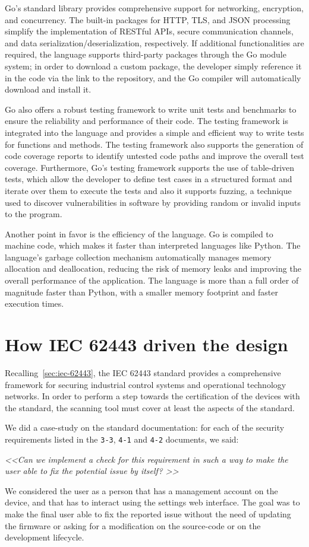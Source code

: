 Go's standard library provides comprehensive support for networking, encryption, and concurrency. The built-in packages for HTTP, TLS, and JSON processing simplify the implementation of RESTful APIs, secure communication channels, and data serialization/deserialization, respectively. If additional functionalities are required, the language supports third-party packages through the Go module system; in order to download a custom package, the developer simply reference it in the code via the link to the repository, and the Go compiler will automatically download and install it.

Go also offers a robust testing framework to write unit tests and benchmarks to ensure the reliability and performance of their code. The testing framework is integrated into the language and provides a simple and efficient way to write tests for functions and methods. The testing framework also supports the generation of code coverage reports to identify untested code paths and improve the overall test coverage. Furthermore, Go's testing framework supports the use of table-driven tests, which allow the developer to define test cases in a structured format and iterate over them to execute the tests and also it supports fuzzing, a technique used to discover vulnerabilities in software by providing random or invalid inputs to the program.

Another point in favor is the efficiency of the language. Go is compiled to machine code, which makes it faster than interpreted languages like Python. The language's garbage collection mechanism automatically manages memory allocation and deallocation, reducing the risk of memory leaks and improving the overall performance of the application. The language is more than a full order of magnitude faster than Python, with a smaller memory footprint and faster execution times.~\cite{go-lang-performance}

\section{How IEC 62443 driven the design}

Recalling~\cref{sec:iec-62443}, the IEC 62443 standard provides a comprehensive framework for securing industrial control systems and operational technology networks. In order to perform a step towards the certification of the devices with the standard, the scanning tool must cover at least the aspects of the standard.

We did a case-study on the standard documentation: for each of the security requirements listed in the \texttt{3-3}, \texttt{4-1} and \texttt{4-2} documents, we said: 
\begin{mdframed}
  \textit{\textless\textless  Can we implement a check for this requirement in such a way to make the user able to fix the potential issue by itself? \textgreater\textgreater}
\end{mdframed}
We considered the user as a person that has a management account on the device, and that has to interact using the settings web interface. The goal was to make the final user able to fix the reported issue without the need of updating the firmware or asking for a modification on the source-code or on the development lifecycle.

